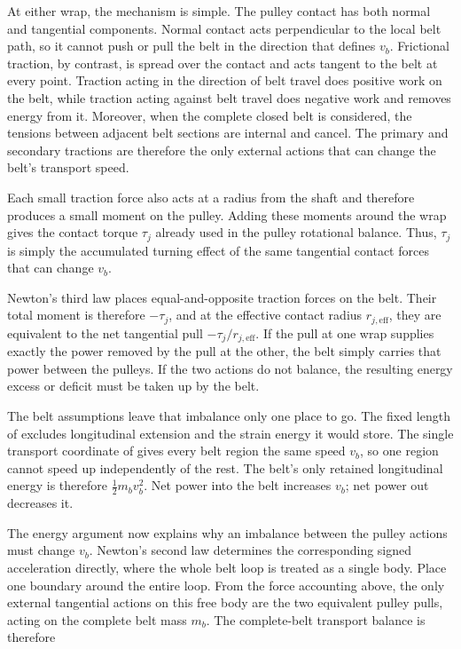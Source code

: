 \documentclass[11pt]{report}
\numberwithin{equation}{section}
\newcounter{assump}
\begin{document}
At either wrap, the mechanism is simple. The pulley contact has both normal
and tangential components. Normal contact acts perpendicular to the local belt
path, so it cannot push or pull the belt in the direction that defines \(v_b\).
Frictional traction, by contrast, is spread over the contact and acts tangent
to the belt at every point. Traction acting in the direction of belt travel
does positive work on the belt, while traction acting against belt travel does
negative work and removes energy from it. Moreover, when the complete closed
belt is considered, the tensions between adjacent belt sections are internal
and cancel. The primary and secondary tractions are therefore the only external
actions that can change the belt's transport speed.

Each small traction force also acts at a radius from the shaft and therefore
produces a small moment on the pulley. Adding these moments around the wrap
gives the contact torque \(\tau_j\) already used in the pulley rotational
balance. Thus, \(\tau_j\) is simply the accumulated turning effect of the same
tangential contact forces that can change \(v_b\).

Newton's third law places equal-and-opposite traction forces on the belt. Their
total moment is therefore \(-\tau_j\), and at the effective contact radius
\(r_{j,\mathrm{eff}}\), they are equivalent to the net tangential pull
\(-\tau_j/r_{j,\mathrm{eff}}\). If the pull at one wrap supplies exactly the
power removed by the pull at the other, the belt simply carries that power
between the pulleys. If the two actions do not balance, the resulting energy
excess or deficit must be taken up by the belt.

The belt assumptions leave that imbalance only one place to go. The fixed
length of  excludes longitudinal extension
and the strain energy it would store. The single transport coordinate of
 gives every belt region the same speed
\(v_b\), so one region cannot speed up independently of the rest. The belt's
only retained longitudinal energy is therefore
\(\tfrac{1}{2}m_bv_b^2\). Net power into the belt increases \(v_b\); net power
out decreases it.

The energy argument now explains why an imbalance between the pulley actions
must change \(v_b\). Newton's second law determines the corresponding signed
acceleration directly, where the whole belt loop is treated as a single body.
Place one boundary around the entire loop. From the force accounting above, the
only external tangential actions on this free body are the two equivalent
pulley pulls, acting on the complete belt mass \(m_b\). The complete-belt
transport balance is therefore
\end{document}
